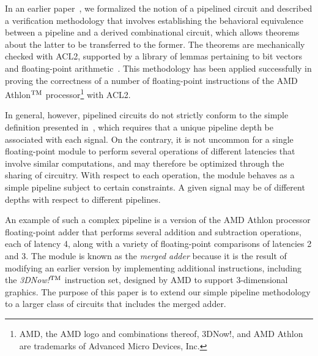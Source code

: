 \documentclass{article}
\begin{document}
In an earlier paper~\cite{mult}, we formalized the notion of a
pipelined circuit and described a verification methodology that
involves establishing the behavioral equivalence between a pipeline
and a derived combinational circuit, which allows theorems about the
latter to be transferred to the former.  The theorems are mechanically
checked with ACL2, supported by a library of lemmas pertaining to bit
vectors and floating-point arithmetic~\cite{fplib}.  This methodology
has been applied successfully in proving the correctness of a number
of floating-point instructions of the AMD Athlon$^{\rm TM}$
processor\footnote{AMD, the AMD logo and combinations thereof, 3DNow!,
and AMD Athlon are trademarks of Advanced Micro Devices, Inc.}  with
ACL2.

In general, however, pipelined circuits do not strictly conform to the
simple definition presented in~\cite{mult}, which requires that a
unique pipeline depth be associated with each signal.  On the
contrary, it is not uncommon for a single floating-point module to
perform several operations of different latencies that involve similar
computations, and may therefore be optimized through the sharing of
circuitry.  With respect to each operation, the module behaves as a
simple pipeline subject to certain constraints.  A given signal may be
of different depths with respect to different pipelines.

An example of such a complex pipeline is a version of the AMD Athlon
processor floating-point adder that performs several addition and
subtraction operations, each of latency 4, along with a variety of
floating-point comparisons of latencies 2 and 3.  The module is known
as the {\it merged adder} because it is the result of modifying an
earlier version by implementing additional instructions, including the
{\it 3DNow!}$^{\rm TM}$ instruction set, designed by AMD to support
3-dimensional graphics.  The purpose of this paper is to extend our
simple pipeline methodology to a larger class of circuits that
includes the merged adder.
\end{document}
